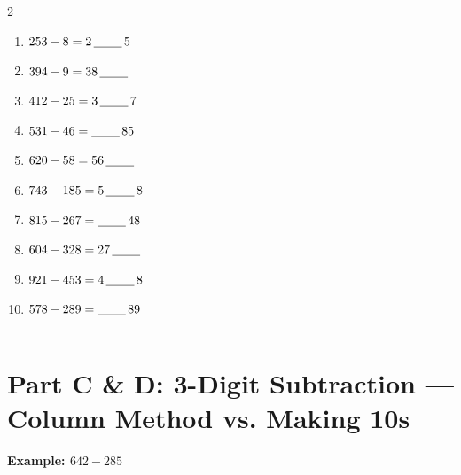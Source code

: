 \documentclass{article}
\begin{document}
\begin{multicols}{2}
\begin{enumerate}[label=\textbf{\arabic*.}, itemsep=1.5em, leftmargin=2em]
  \item $253 - 8 = 2\,\underline{\hspace{0.8cm}}\,5$
  \item $394 - 9 = 38\,\underline{\hspace{0.8cm}}$
  \item $412 - 25 = 3\,\underline{\hspace{0.8cm}}\,7$
  \item $531 - 46 = \underline{\hspace{0.8cm}}\,85$
  \item $620 - 58 = 56\,\underline{\hspace{0.8cm}}$
  \item $743 - 185 = 5\,\underline{\hspace{0.8cm}}\,8$
  \item $815 - 267 = \underline{\hspace{0.8cm}}\,48$
  \item $604 - 328 = 27\,\underline{\hspace{0.8cm}}$
  \item $921 - 453 = 4\,\underline{\hspace{0.8cm}}\,8$
  \item $578 - 289 = \underline{\hspace{0.8cm}}\,89$
\end{enumerate}
\end{multicols}

\vspace{1em}
\noindent\textcolor{subtext!40}{\rule{\linewidth}{0.5pt}}
\vspace{1em}

\clearpage
\section*{Part C \& D: 3-Digit Subtraction — Column Method vs. Making 10s}
\vspace{0.5em}

{\Large \textbf{Example: $642 - 285$}}
\vspace{0.5em}
\end{document}
